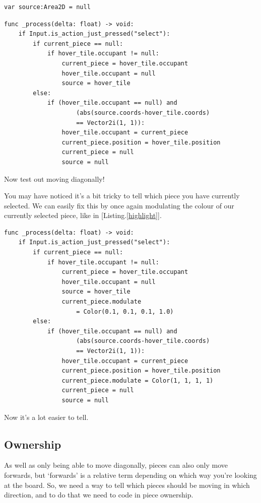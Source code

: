 \documentclass[14pt]{extarticle}
\newcommand{\prettyref}[2]{[{#1}.\ref{#2}]}
\begin{document}
\begin{lstlisting}[language=gdscript, label={bruh}, caption=Source Tile variable]
var source:Area2D = null
\end{lstlisting}

\begin{lstlisting}[language=gdscript, label={check}, caption=Diagonal movement code]
func _process(delta: float) -> void:
	if Input.is_action_just_pressed("select"):
		if current_piece == null:
			if hover_tile.occupant != null:
				current_piece = hover_tile.occupant
				hover_tile.occupant = null
				source = hover_tile
		else:
			if (hover_tile.occupant == null) and
                    (abs(source.coords-hover_tile.coords)
                    == Vector2i(1, 1)):
				hover_tile.occupant = current_piece
				current_piece.position = hover_tile.position
				current_piece = null
				source = null
\end{lstlisting}

Now test out moving diagonally!

You may have noticed it's a bit tricky to tell which piece you have currently selected. We can easily fix this by once again modulating the colour of our currently selected piece, like in \prettyref{Listing}{highlight}.

\begin{lstlisting}[language=gdscript, label={highlight}, caption=Highlighting selected piece]
func _process(delta: float) -> void:
	if Input.is_action_just_pressed("select"):
		if current_piece == null:
			if hover_tile.occupant != null:
				current_piece = hover_tile.occupant
				hover_tile.occupant = null
				source = hover_tile
                current_piece.modulate
                    = Color(0.1, 0.1, 0.1, 1.0)
		else:
			if (hover_tile.occupant == null) and
                    (abs(source.coords-hover_tile.coords)
                    == Vector2i(1, 1)):
				hover_tile.occupant = current_piece
				current_piece.position = hover_tile.position
                current_piece.modulate = Color(1, 1, 1, 1)
				current_piece = null
				source = null
\end{lstlisting}

Now it's a lot easier to tell.

\subsection*{Ownership}
As well as only being able to move diagonally, pieces can also only move forwards, but `forwards' is a relative term depending on which way you're looking at the board. So, we need a way to tell which pieces should be moving in which direction, and to do that we need to code in piece ownership.
\end{document}
